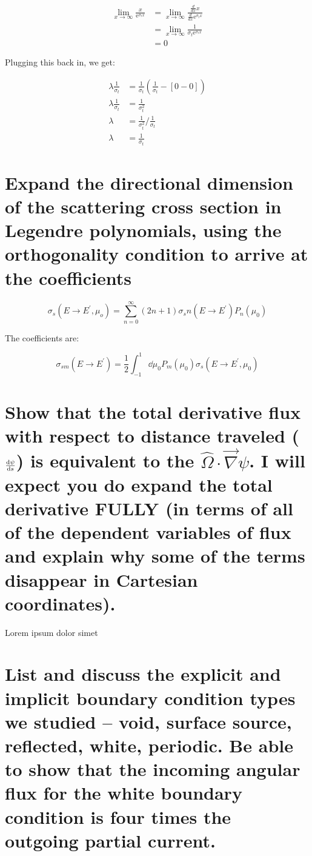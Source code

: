 \documentclass{article}
\begin{document}
\begin{align*}
    \lim_{x\to\infty}\frac{x}{\mathrm{e}^{\sigma_t x}} &= \lim_{x\to\infty}\frac{\frac{d}{dx}x}{\frac{d}{dx}\mathrm{e}^{\sigma_t x}} \\
    &= \lim_{x\to\infty}\frac{1}{\sigma_t \mathrm{e}^{\sigma_t x}} \\
    &= 0
\end{align*}

Plugging this back in, we get:

\begin{align*}
    \lambda \frac{1}{\sigma_t} &= \frac{1}{\sigma_t} \left( \frac{1}{\sigma_t} - \left[ 0 - 0 \right] \right) \\
    \lambda \frac{1}{\sigma_t} &= \frac{1}{\sigma_t^2} \\
    \lambda &= {\frac{1}{\sigma_t^2}} / {\frac{1}{\sigma_t}} \\
    \lambda &= \frac{1}{\sigma_t}
\end{align*}

\newpage
\section{Expand the directional dimension of the scattering cross section in Legendre polynomials, using the orthogonality condition to arrive at the coefficients}

$$
\sigma_s(E \rightarrow E^\prime, \mu_o) = \sum_{n=0}^\infty (2n+1) \sigma_sn(E \rightarrow E^\prime) P_n (\mu_0)
$$

The coefficients are:

$$
\sigma_{sm}(E \rightarrow E^\prime) = \frac{1}{2} \int_{-1}^{1} \dd{\mu_0} P_m(\mu_0) \sigma_s(E\rightarrow E^\prime, \mu_0)
$$

\newpage
\section{Show that the total derivative flux with respect to distance traveled ($\dv{\psi}{s}$) is equivalent to the $\hat{\Omega} \cdot \vec{\nabla} \psi$. I will expect you do expand the total derivative FULLY (in terms of all of the dependent variables of flux and explain why some of the terms disappear in Cartesian coordinates).}

Lorem ipsum dolor simet

\newpage
\section{List and discuss the explicit and implicit boundary condition types we studied -- void, surface source, reflected, white, periodic. Be able to show that the incoming angular flux for the white boundary condition is four times the outgoing partial current.}
\end{document}
